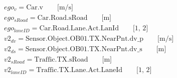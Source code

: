 \begin{equation*}
\begin{split}
ego_v = \text{Car.v} \qquad \text{[m/s]} \\
ego_{sRoad} = \text{Car.Road.sRoad} \qquad \text{[m]} \\
ego_{laneID} = \text{Car.Road.Lane.Act.LanId} \qquad \text{[1, 2]} \\
v2_{dv} = \text{Sensor.Object.OB01.TX.NearPnt.dv\_p} \qquad \text{[m/s]} \\
v2_{ds} = \text{Sensor.Object.OB01.TX.NearPnt.dv\_s} \qquad \text{[m]} \\
v2_{sRoad} = \text{Traffic.TX.sRoad} \qquad \text{[m]} \\
v2_{laneID} = \text{Traffic.TX.Lane.Act.LaneId} \qquad \text{[1, 2]} \\
\end{split}
\end{equation*}

